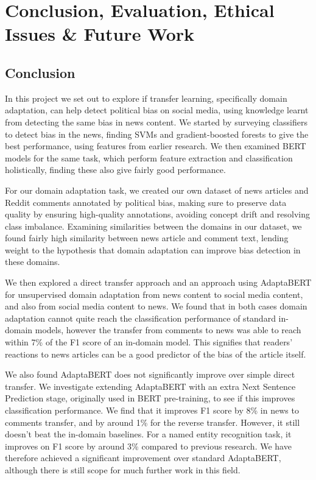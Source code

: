 \chapter{Conclusion, Evaluation, Ethical Issues \& Future Work}

\section{Conclusion}

In this project we set out to explore if transfer learning, specifically domain adaptation, can help detect political bias on social media, using knowledge learnt from detecting the same bias in news content. We started by surveying classifiers to detect bias in the news, finding SVMs and gradient-boosted forests to give the best performance, using features from earlier research. We then examined BERT models for the same task, which perform feature extraction and classification holistically, finding these also give fairly good performance.

For our domain adaptation task, we created our own dataset of news articles and Reddit comments annotated by political bias, making sure to preserve data quality by ensuring high-quality annotations, avoiding concept drift and resolving class imbalance. Examining similarities between the domains in our dataset, we found fairly high similarity between news article and comment text, lending weight to the hypothesis that domain adaptation can improve bias detection in these domains.

We then explored a direct transfer approach and an approach using AdaptaBERT for unsupervised domain adaptation from news content to social media content, and also from social media content to news. We found that in both cases domain adaptation cannot quite reach the classification performance of standard in-domain models, however the transfer from comments to news was able to reach within 7\% of the F1 score of an in-domain model. This signifies that readers' reactions to news articles can be a good predictor of the bias of the article itself.

We also found AdaptaBERT does not significantly improve over simple direct transfer. We investigate extending AdaptaBERT with an extra Next Sentence Prediction stage, originally used in BERT pre-training, to see if this improves classification performance. We find that it improves F1 score by 8\% in news to comments transfer, and by around 1\% for the reverse transfer. However, it still doesn't beat the in-domain baselines. For a named entity recognition task, it improves on F1 score by around 3\% compared to previous research. We have therefore achieved a significant improvement over standard AdaptaBERT, although there is still scope for much further work in this field.

